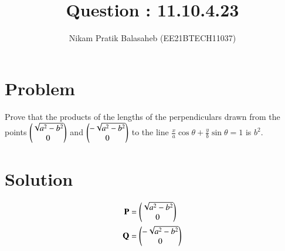 \documentclass[journal,12pt,twocolumn]{IEEEtran}
\begin{document}
\let\StandardTheFigure\thefigure
\let\vec\mathbf
\renewcommand{\thefigure}{\theproblem}



\def\putbox#1#2#3{\makebox[0in][l]{\makebox[#1][l]{}\raisebox{\baselineskip}[0in][0in]{\raisebox{#2}[0in][0in]{#3}}}}
     \def\rightbox#1{\makebox[0in][r]{#1}}
     \def\centbox#1{\makebox[0in]{#1}}
     \def\topbox#1{\raisebox{-\baselineskip}[0in][0in]{#1}}
     \def\midbox#1{\raisebox{-0.5\baselineskip}[0in][0in]{#1}}

\vspace{3cm}


\title{Question : 11.10.4.23}
\author{Nikam Pratik Balasaheb (EE21BTECH11037)}


\maketitle

\newpage


\bigskip

\renewcommand{\thefigure}{\theenumi}
\renewcommand{\thetable}{\theenumi}

\section{Problem}
Prove that the products of the lengths of the perpendiculars drawn from the points $\begin{pmatrix}\sqrt{a^2-b^2}\\0\end{pmatrix}$ and $\begin{pmatrix}-\sqrt{a^2-b^2} \\0\end{pmatrix} $ to the line $\frac{x}{a} \cos{\theta} + \frac{y}{b}\sin{\theta} =1 $ is $ b^2 $.

\section{Solution}

\begin{align}
	\vec{P} &=\myvec{\sqrt{a^2-b^2}\\0} \\
	\vec{Q} &= \myvec{-\sqrt{a^2-b^2} \\ 0}
\end{align}
\end{document}
